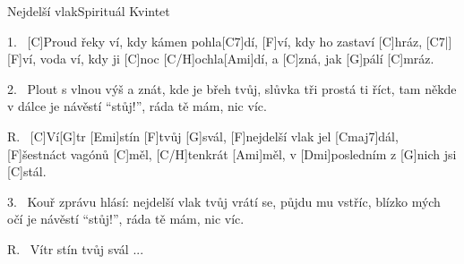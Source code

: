\begin{song}{Nejdelší vlak}{Spirituál Kvintet}

\begin{xverse}{1.~}
[\large C]Proud řeky ví, kdy kámen pohla[\large C7]dí,
[\large F]ví, kdy ho zastaví [\large C]hráz, [\large C7|]{}
[\large F]ví, voda ví, kdy ji [\large C]noc [\large C/H]ochla[\large Ami]dí,
a [\large C]zná, jak [\large G]pálí [\large C]mráz.
\end{xverse}


\begin{xverse}{2.~}
Plout s vlnou výš a znát, kde je břeh tvůj,
slůvka tři prostá ti říct,
tam někde v dálce je návěstí ``stůj!'',
ráda tě mám, nic víc.
\end{xverse}


\begin{xverse}{R.~}
[\large C]Ví[\large G]tr [\large Emi]stín [\large F]tvůj [\large G]svál,
[\large F]nejdelší vlak jel [\large Cmaj7]dál,
[\large F]{šest}náct vagónů [\large C]měl, [\large C/H]tenkrát [\large Ami]měl,
v [\large Dmi]posledním z [\large G]nich jsi [\large C]stál.
\end{xverse}


\begin{xverse}{3.~}
Kouř zprávu hlásí: nejdelší vlak tvůj
vrátí se, půjdu mu vstříc,
blízko mých očí je návěstí ``stůj!'',
ráda tě mám, nic víc.
\end{xverse}


\begin{xverse}{R.~}
Vítr stín tvůj svál ...
\end{xverse}

\end{song}
\chords{\chordCmajSeven \chordCH}

